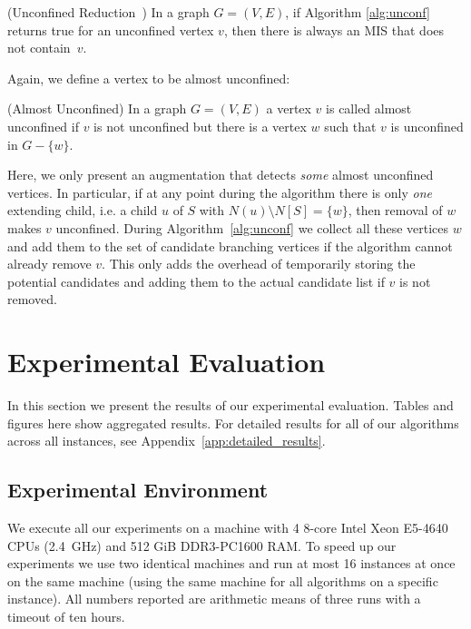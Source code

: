 \documentclass[a4paper,UKenglish,cleveref, autoref, thm-restate]{lipics-v2021}
\begin{document}
\begin{theorem}(Unconfined Reduction~\cite{XiaoUnconfined}) In a graph $G=(V,E)$,
  if Algorithm \ref{alg:unconf} returns true for an unconfined vertex $v$, then
  there is always an MIS that does not contain~$v$.
\end{theorem}

Again, we define a vertex to be almost unconfined:

\begin{definition} (Almost Unconfined)
  In a graph $G=(V,E)$ a vertex $v$ is called almost unconfined if $v$ is not unconfined but there is a vertex $w$ such that $v$ is unconfined in $G-\{w\}$.
\end{definition}

Here, we only present an augmentation that detects \emph{some} almost
unconfined vertices. In particular, if at any point during the algorithm there
is only \emph{one} extending child, i.e. a child $u$ of $S$ with $N(u)\setminus
N[S] = \{w\}$, then removal of $w$ makes $v$ unconfined. During
Algorithm~\ref{alg:unconf} we collect all these vertices $w$ and add them to the
set of candidate branching vertices if the algorithm cannot already remove $v$.
This only adds the overhead of temporarily storing the potential candidates and
adding them to the actual candidate list if $v$ is not removed.


\section{Experimental Evaluation}

In this section we present the results of our experimental evaluation. Tables
and figures here show aggregated results. For
detailed results for all of our algorithms across all instances, see Appendix~\ref{app:detailed_results}.

\subsection{Experimental Environment}
We execute all our experiments on a machine with 4 8-core Intel Xeon E5-4640 CPUs
(2.4~GHz) and 512 GiB DDR3-PC1600 RAM. To speed up our experiments we use two
identical machines and run at most 16 instances at once on the
same machine (using the same machine for all algorithms on a specific instance).
All numbers reported are arithmetic means of three runs with a timeout of ten hours.
\end{document}
